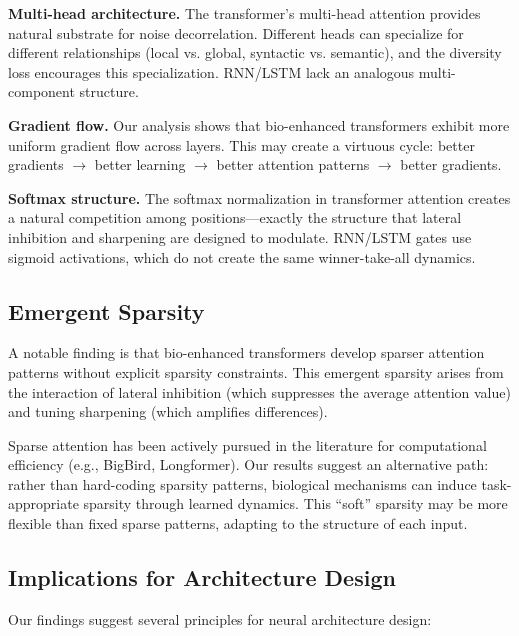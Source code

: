 \textbf{Multi-head architecture.} The transformer's multi-head attention provides natural substrate for noise decorrelation. Different heads can specialize for different relationships (local vs. global, syntactic vs. semantic), and the diversity loss encourages this specialization. RNN/LSTM lack an analogous multi-component structure.

\textbf{Gradient flow.} Our analysis shows that bio-enhanced transformers exhibit more uniform gradient flow across layers. This may create a virtuous cycle: better gradients $\rightarrow$ better learning $\rightarrow$ better attention patterns $\rightarrow$ better gradients.

\textbf{Softmax structure.} The softmax normalization in transformer attention creates a natural competition among positions---exactly the structure that lateral inhibition and sharpening are designed to modulate. RNN/LSTM gates use sigmoid activations, which do not create the same winner-take-all dynamics.

\subsection{Emergent Sparsity}

A notable finding is that bio-enhanced transformers develop sparser attention patterns without explicit sparsity constraints. This emergent sparsity arises from the interaction of lateral inhibition (which suppresses the average attention value) and tuning sharpening (which amplifies differences).

Sparse attention has been actively pursued in the literature for computational efficiency (e.g., BigBird, Longformer). Our results suggest an alternative path: rather than hard-coding sparsity patterns, biological mechanisms can induce task-appropriate sparsity through learned dynamics. This ``soft'' sparsity may be more flexible than fixed sparse patterns, adapting to the structure of each input.

\subsection{Implications for Architecture Design}

Our findings suggest several principles for neural architecture design:

